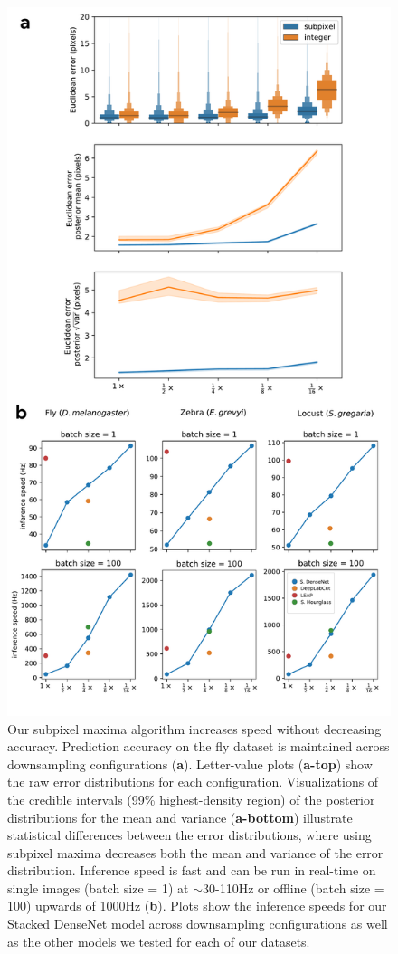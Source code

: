 \documentclass[11pt,a4paper,twoside]{book}
\begin{document}
\begin{doublespace}
\begin{appendices}
\begin{figure}[!htb]
    \centering
    \includegraphics[width=0.60\linewidth]{Graving_IMPRS_Thesis/figures/downsample_inference_speed.pdf}
    \caption{Our subpixel maxima algorithm increases speed without decreasing accuracy. Prediction accuracy on the fly dataset is maintained across downsampling configurations (\textbf{a}). Letter-value plots (\textbf{a-top}) show the raw error distributions for each configuration. Visualizations of the credible intervals (99\% highest-density region) of the posterior distributions for the mean and variance (\textbf{a-bottom}) illustrate statistical differences between the error distributions, where using subpixel maxima decreases both the mean and variance of the error distribution. Inference speed is fast and can be run in real-time on single images (batch size = 1) at $\sim$30-110Hz or offline (batch size = 100) upwards of 1000Hz (\textbf{b}). Plots show the inference speeds for our Stacked DenseNet model across downsampling configurations as well as the other models we tested for each of our datasets. }
    \label{fig:downsample_inference_speed}
    
    
    \end{figure}
    
    \begin{figure}[!htb]
    

\end{figure}
\end{appendices}
\end{doublespace}
\end{document}
